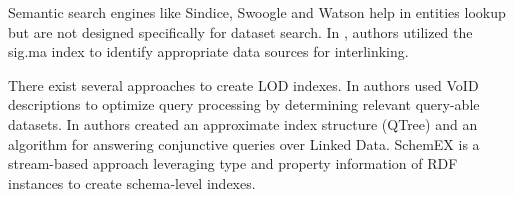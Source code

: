 \documentclass[runningheads,a4paper]{llncs}
\begin{document}
Semantic search engines like Sindice\cite{Delbru2010a}, Swoogle\cite{Ding2004} and Watson\cite{d'Aquin:2011:WMS:2019470.2019476} help in entities lookup but are not designed specifically for dataset search. In \cite{whatShouldILinkTo}, authors utilized the sig.ma index\cite{Tummarello10sig.ma:live} to identify appropriate data sources for interlinking.

There exist several approaches to create LOD indexes. In \cite{Alexander:LDOW09} authors used VoID descriptions to optimize query processing by determining relevant query-able datasets. In \cite{Harth:2010:DSO:1772690.1772733} authors created an approximate index structure (QTree) and an algorithm for answering conjunctive queries over Linked Data. SchemEX\cite{Konrath:2012:SEC:2399444.2399563} is a stream-based approach leveraging type and property information of RDF instances to create schema-level indexes.


\nocite{*}

\end{document}
